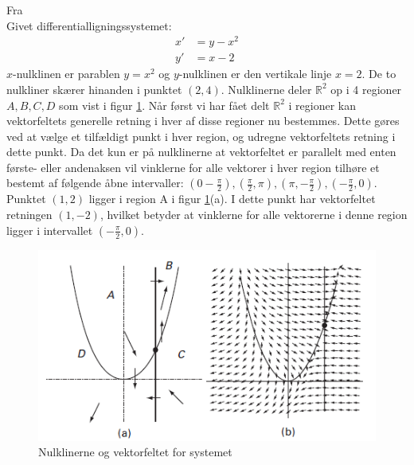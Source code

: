 \begin{Example}\textnormal{Fra \citep{Hirsch}}\\
\textnormal{Givet differentialligningssystemet:}
\begin{align*}
    x'&=y-x^2 \\
    y'&=x-2
\end{align*}
\textnormal{$x$-nulklinen er parablen $y=x^2$ og $y$-nulklinen er den vertikale linje $x=2$. De to nulkliner skærer hinanden i punktet $(2,4)$. Nulklinerne deler $\mathbb{R}^2$ op i 4 regioner $A,B,C,D$ som vist i figur \ref{nulkliner}. Når først vi har fået delt $\mathbb{R}^2$ i regioner kan vektorfeltets generelle retning i hver af disse regioner nu bestemmes. Dette gøres ved at vælge et tilfældigt punkt i hver region, og udregne vektorfeltets retning i dette punkt. Da det kun er på nulklinerne at vektorfeltet er parallelt med enten første- eller andenaksen vil vinklerne for alle vektorer i hver region tilhøre et bestemt af følgende åbne intervaller: $(0-\frac{\pi}{2}),(\frac{\pi}{2},\pi),(\pi,-\frac{\pi}{2}),(-\frac{\pi}{2},0)$. Punktet $(1,2)$ ligger i region A i figur \ref{nulkliner}(a). I dette punkt har vektorfeltet retningen $(1,-2)$, hvilket betyder at vinklerne for alle vektorerne i denne region ligger i intervallet $(-\frac{\pi}{2},0)$.  }

\begin{figure} [H]
    \centering
    \includegraphics[scale=0.8]{Images/nulkliner.png}
    \caption{Nulklinerne og vektorfeltet for systemet}
    \label{nulkliner}
\end{figure}
\end{Example}



